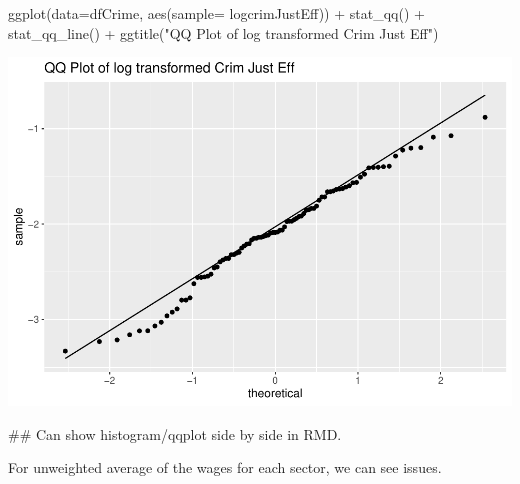\documentclass[]{article}
\newenvironment{Shaded}{}{}
\newcommand{\CommentTok}[1]{\textcolor[rgb]{0.00,0.50,0.00}{#1}}
\newcommand{\DataTypeTok}[1]{#1}
\newcommand{\KeywordTok}[1]{\textcolor[rgb]{0.00,0.00,1.00}{#1}}
\newcommand{\NormalTok}[1]{#1}
\newcommand{\OperatorTok}[1]{#1}
\newcommand{\StringTok}[1]{\textcolor[rgb]{0.00,0.50,0.50}{#1}}
\begin{document}
\begin{Shaded}
\begin{Highlighting}[]
\KeywordTok{ggplot}\NormalTok{(}\DataTypeTok{data=}\NormalTok{dfCrime, }\KeywordTok{aes}\NormalTok{(}\DataTypeTok{sample=}\NormalTok{ logcrimJustEff)) }\OperatorTok{+}\StringTok{ }\KeywordTok{stat_qq}\NormalTok{() }\OperatorTok{+}\StringTok{ }\KeywordTok{stat_qq_line}\NormalTok{() }\OperatorTok{+}\StringTok{ }
\KeywordTok{ggtitle}\NormalTok{(}\StringTok{"QQ Plot of log transformed Crim Just Eff"}\NormalTok{)}
\end{Highlighting}
\end{Shaded}

\includegraphics{Bagnard_Gaustad_Hartman_Leung_Lab_3_files/figure-latex/unnamed-chunk-72-1.pdf}

\begin{Shaded}
\begin{Highlighting}[]
\CommentTok{## Can show histogram/qqplot side by side in RMD. }
\end{Highlighting}
\end{Shaded}

For unweighted average of the wages for each sector, we can see issues.
\end{document}

